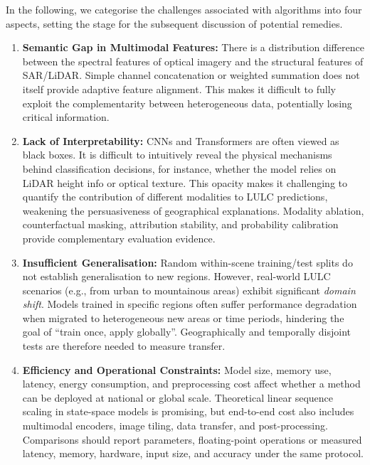 \documentclass[]{interact}
\theoremstyle{plain}%
\theoremstyle{definition}
\theoremstyle{remark}
\begin{document}
In the following, we categorise the challenges associated with algorithms into four aspects, setting the stage for the subsequent discussion of potential remedies.


\begin{enumerate}
	\item \textbf{Semantic Gap in Multimodal Features:} There is a distribution difference between the spectral features of optical imagery and the structural features of SAR/LiDAR. Simple channel concatenation or weighted summation does not itself provide adaptive feature alignment. This makes it difficult to fully exploit the complementarity between heterogeneous data, potentially losing critical information.
	
	\item \textbf{Lack of Interpretability:} CNNs and Transformers are often viewed as black boxes. It is difficult to intuitively reveal the physical mechanisms behind classification decisions, for instance, whether the model relies on LiDAR height info or optical texture. This opacity makes it challenging to quantify the contribution of different modalities to LULC predictions, weakening the persuasiveness of geographical explanations. Modality ablation, counterfactual masking, attribution stability, and probability calibration provide complementary evaluation evidence.
	
	\item \textbf{Insufficient Generalisation:} Random within-scene training/test splits do not establish generalisation to new regions. However, real-world LULC scenarios (e.g., from urban to mountainous areas) exhibit significant \textit{domain shift}. Models trained in specific regions often suffer performance degradation when migrated to heterogeneous new areas or time periods, hindering the goal of ``train once, apply globally''. Geographically and temporally disjoint tests are therefore needed to measure transfer. 
	\item \textbf{Efficiency and Operational Constraints:} Model size, memory use, latency, energy consumption, and preprocessing cost affect whether a method can be deployed at national or global scale. Theoretical linear sequence scaling in state-space models is promising, but end-to-end cost also includes multimodal encoders, image tiling, data transfer, and post-processing. Comparisons should report parameters, floating-point operations or measured latency, memory, hardware, input size, and accuracy under the same protocol.
\end{enumerate}
\end{document}
